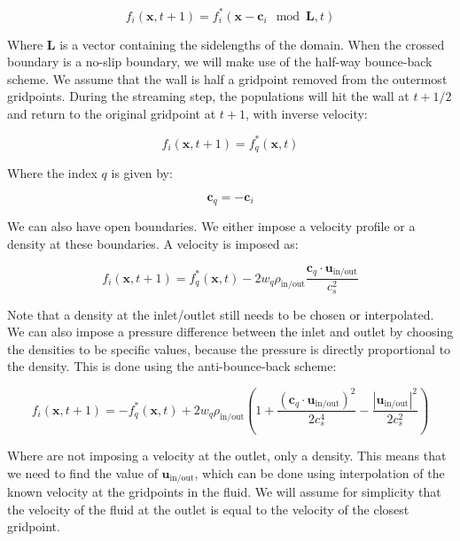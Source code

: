 \begin{equation}\label{eq:Periodic streaming step}
    f_i(\bm{x}, t+1) = f_i^*(\bm{x} - \bm{c}_i \mod \bm{L} , t)
\end{equation}

Where $\bm{L}$ is a vector containing the sidelengths of the domain. When the crossed boundary is a no-slip boundary, we will make use of the half-way bounce-back scheme. We assume that the wall is half a gridpoint removed from the outermost gridpoints. During the streaming step, the populations will hit the wall at $t + 1/2$ and return to the original gridpoint at $t + 1$, with inverse velocity:

\begin{equation}\label{eq:No-slip streaming step}
    f_i(\bm{x}, t+1) = f_q^*(\bm{x}, t)
\end{equation}

Where the index $q$ is given by:

\begin{equation}\label{eq:Bounce-back velocity component}
    \bm{c}_q = -\bm{c}_i
\end{equation}

We can also have open boundaries. We either impose a velocity profile or a density at these boundaries. A velocity is imposed as:

\begin{equation}
    f_i(\bm{x}, t+1) = f_q^*(\bm{x}, t) - 2 w_q \rho_{\text{in/out}} \frac{\bm{c}_q \cdot \bm{u}_{\text{in/out}}}{c_s^2}
\end{equation}

Note that a density at the inlet/outlet still needs to be chosen or interpolated. We can also impose a pressure difference between the inlet and outlet by choosing the densities to be specific values, because the pressure is directly proportional to the density. This is done using the anti-bounce-back scheme:

\begin{equation}
    f_i(\bm{x}, t+1) = -f_q^*(\bm{x}, t) + 2 w_q \rho_{\text{in/out}} \left( 1 + \frac{{\left(\bm{c}_q \cdot \bm{u}_{\text{in/out}}\right)}^2}{2 c_s^4} - \frac{|\bm{u}_{\text{in/out}}|^2}{2 c_s^2} \right)
\end{equation}

Where are not imposing a velocity at the outlet, only a density. This means that we need to find the value of $\bm{u}_{\text{in/out}}$, which can be done using interpolation of the known velocity at the gridpoints in the fluid. We will assume for simplicity that the velocity of the fluid at the outlet is equal to the velocity of the closest gridpoint. 

